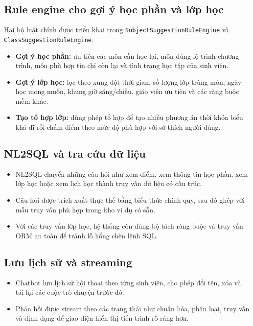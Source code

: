 \documentclass[12pt,a4paper]{report}
\begin{document}
\subsection{Rule engine cho gợi ý học phần và lớp học}
Hai bộ luật chính được triển khai trong \texttt{SubjectSuggestionRuleEngine} và \texttt{ClassSuggestionRuleEngine}.
\begin{itemize}
    \item \textbf{Gợi ý học phần:} ưu tiên các môn cần học lại, môn đúng lộ trình chương trình, môn phù hợp tín chỉ còn lại và tình trạng học tập của sinh viên.
    \item \textbf{Gợi ý lớp học:} lọc theo xung đột thời gian, số lượng lớp trùng môn, ngày học mong muốn, khung giờ sáng/chiều, giáo viên ưu tiên và các ràng buộc mềm khác.
    \item \textbf{Tạo tổ hợp lớp:} dùng phép tổ hợp để tạo nhiều phương án thời khóa biểu khả dĩ rồi chấm điểm theo mức độ phù hợp với sở thích người dùng.
\end{itemize}

\subsection{NL2SQL và tra cứu dữ liệu}
\begin{itemize}
    \item NL2SQL chuyển những câu hỏi như xem điểm, xem thông tin học phần, xem lớp học hoặc xem lịch học thành truy vấn dữ liệu có cấu trúc.
    \item Câu hỏi được trích xuất thực thể bằng biểu thức chính quy, sau đó ghép với mẫu truy vấn phù hợp trong kho ví dụ có sẵn.
    \item Với các truy vấn lớp học, hệ thống còn dùng bộ tách ràng buộc và truy vấn ORM an toàn để tránh lỗ hổng chèn lệnh SQL.
\end{itemize}

\subsection{Lưu lịch sử và streaming}
\begin{itemize}
    \item Chatbot lưu lịch sử hội thoại theo từng sinh viên, cho phép đổi tên, xóa và tải lại các cuộc trò chuyện trước đó.
    \item Phản hồi được stream theo các trạng thái như chuẩn hóa, phân loại, truy vấn và định dạng để giao diện hiển thị tiến trình rõ ràng hơn.
\end{itemize}
\end{document}
